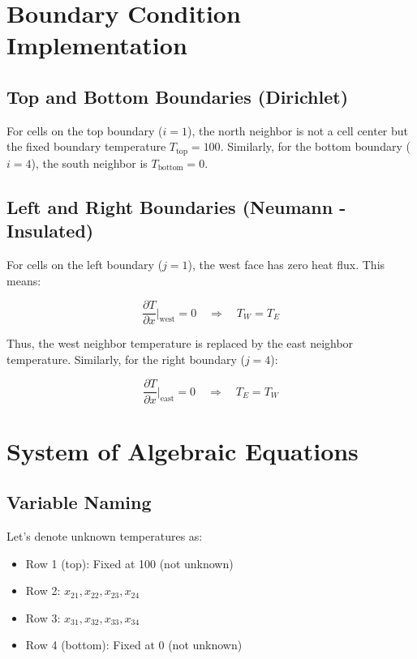 \documentclass{article}
\begin{document}
\section{Boundary Condition Implementation}

\subsection{Top and Bottom Boundaries (Dirichlet)}
For cells on the top boundary ($i=1$), the north neighbor is not a cell center but the fixed boundary temperature $T_{\text{top}} = 100$. Similarly, for the bottom boundary ($i=4$), the south neighbor is $T_{\text{bottom}} = 0$.

\subsection{Left and Right Boundaries (Neumann - Insulated)}
For cells on the left boundary ($j=1$), the west face has zero heat flux. This means:

\begin{equation}
\frac{\partial T}{\partial x}\bigg|_{\text{west}} = 0 \quad \Rightarrow \quad T_W = T_E
\end{equation}

Thus, the west neighbor temperature is replaced by the east neighbor temperature. Similarly, for the right boundary ($j=4$):

\begin{equation}
\frac{\partial T}{\partial x}\bigg|_{\text{east}} = 0 \quad \Rightarrow \quad T_E = T_W
\end{equation}

\section{System of Algebraic Equations}

\subsection{Variable Naming}
Let's denote unknown temperatures as:
\begin{itemize}
    \item Row 1 (top): Fixed at 100 (not unknown)
    \item Row 2: $x_{21}, x_{22}, x_{23}, x_{24}$
    \item Row 3: $x_{31}, x_{32}, x_{33}, x_{34}$
    \item Row 4 (bottom): Fixed at 0 (not unknown)
\end{itemize}
\end{document}
